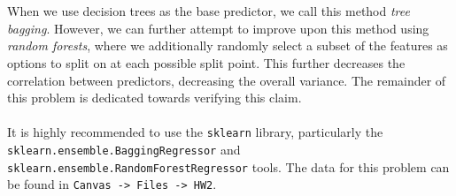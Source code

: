 \documentclass{exam}
\begin{document}
\\\\
When we use decision trees as the base predictor, we call this method \emph{tree bagging}. However, we can further attempt to improve upon this method using \emph{random forests}, where we additionally randomly select a subset of the features as options to split on at each possible split point. This further decreases the correlation between predictors, decreasing the overall variance. The remainder of this problem is dedicated towards verifying this claim.
\\\\
It is highly recommended to use the \texttt{sklearn} library, particularly the \texttt{sklearn.ensemble.BaggingRegressor} and \texttt{sklearn.ensemble.RandomForestRegressor} tools. The data for this problem can be found in \texttt{Canvas -> Files -> HW2}.
\end{document}
